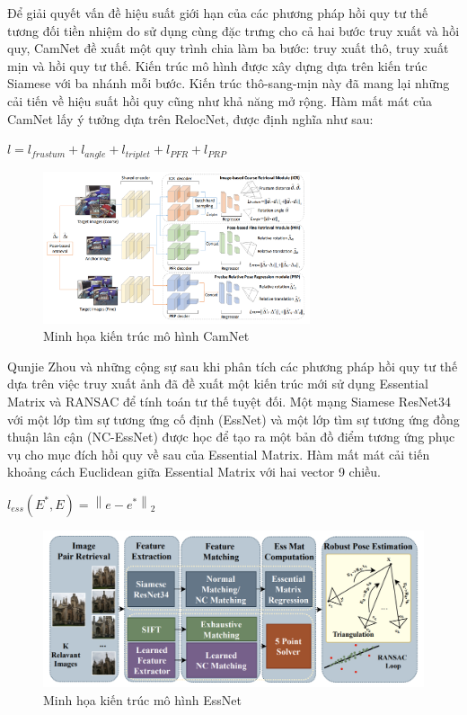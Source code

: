 Để giải quyết vấn đề hiệu suất giới hạn của các phương pháp hồi quy tư thế tương đối tiền nhiệm do sử dụng cùng đặc trưng cho cả hai bước truy xuất và hồi quy, CamNet \cite{9008579} đề xuất một quy trình chia làm ba bước: truy xuất thô, truy xuất mịn và hồi quy tư thế. Kiến trúc mô hình được xây dựng dựa trên kiến trúc Siamese với ba nhánh mỗi bước. Kiến trúc thô-sang-mịn này đã mang lại những cải tiến về hiệu suất hồi quy cũng như khả năng mở rộng. Hàm mất mát của CamNet lấy ý tưởng dựa trên RelocNet, được định nghĩa như sau:
\begin{center}
    $l = l_{frustum} + l_{angle} + l_{triplet} + l_{PFR} + l_{PRP}$
\end{center}
\begin{figure}[H]
    \centering
    \includegraphics[width=0.7\textwidth]{pics/Chapter2/camnet.png}
    \caption{Minh họa kiến trúc mô hình CamNet \cite{9008579}}
\end{figure}
Qunjie Zhou và những cộng sự \cite{zhou2020learn} sau khi phân tích các phương pháp hồi quy tư thế dựa trên việc truy xuất ảnh đã đề xuất một kiến trúc mới sử dụng Essential Matrix và RANSAC để tính toán tư thế tuyệt đối. Một mạng Siamese ResNet34 với một lớp tìm sự tương ứng cố định (EssNet) và một lớp tìm sự tương ứng đồng thuận lân cận (NC-EssNet) được học để tạo ra một bản đồ điểm tương ứng phục vụ cho mục đích hồi quy về sau của Essential Matrix. Hàm mất mát cải tiến khoảng cách Euclidean giữa Essential Matrix với hai vector 9 chiều.
\begin{center}
    $l_{ess}(E^*, E) = \left \| e - e^* \right \|_2$
\end{center}
\begin{figure}[H]
    \centering
    \includegraphics[width=\textwidth]{pics/Chapter2/essnet.png}
    \caption{Minh họa kiến trúc mô hình EssNet \cite{zhou2020learn}}
\end{figure}

